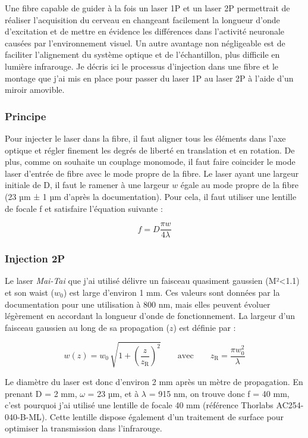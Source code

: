 
Une fibre capable de guider à la fois un laser 1P et un laser 2P permettrait de réaliser l'acquisition du cerveau en changeant facilement la longueur d'onde d'excitation et de mettre en évidence les différences dans l'activité neuronale causées par l'environnement visuel. Un autre avantage non négligeable est de faciliter l'alignement du système optique et de l'échantillon, plus difficile en lumière infrarouge. Je décris ici le processus d'injection dans une fibre et le montage que j'ai mis en place pour passer du laser 1P au laser 2P à l'aide d'un miroir amovible. 

\subsubsection{Principe}

Pour injecter le laser dans la fibre, il faut aligner tous les éléments dans l'axe optique et régler finement les degrés de liberté en translation et en rotation. De plus, comme on souhaite un couplage monomode, il faut faire coincider le mode laser d'entrée de fibre avec le mode propre de la fibre. Le laser ayant une largeur initiale de D, il faut le ramener à une largeur $w$ égale au mode propre de la fibre (23 µm ± 1 µm d'après la documentation). Pour cela, il faut utiliser une lentille de focale f et satisfaire l'équation suivante :

$$
f = D\frac{\pi w}{4\lambda}
$$

\subsubsection{Injection 2P}

Le laser \emph{Mai-Tai} que j'ai utilisé délivre un faisceau quasiment gaussien (M²<1.1) et son waist ($w_0$) est large d'environ 1 mm. Ces valeurs sont données par la documentation pour une utilisation à 800 nm, mais elles peuvent évoluer légèrement en accordant la longueur d'onde de fonctionnement. La largeur d'un faisceau gaussien au long de sa propagation ($z$) est définie par :

$$
w(z) = w_0 \, \sqrt{ 1+ {\left( \frac{z}{z_\mathrm{R}} \right)}^2 } \qquad \text{avec} \qquad
z_\mathrm{R} = \frac{\pi w_0^2 }{\lambda}
$$

Le diamètre du laser est donc d'environ 2 mm après un mètre de propagation. En prenant D = 2 mm, $\omega$ = 23 µm, et à $\lambda$ = 915 nm, on trouve donc f = 40 mm, c'est pourquoi j'ai utilisé une lentille de focale 40 mm (référence Thorlabs AC254-040-B-ML). Cette lentille dispose également d'un traitement de surface pour optimiser la transmission dans l'infrarouge.

